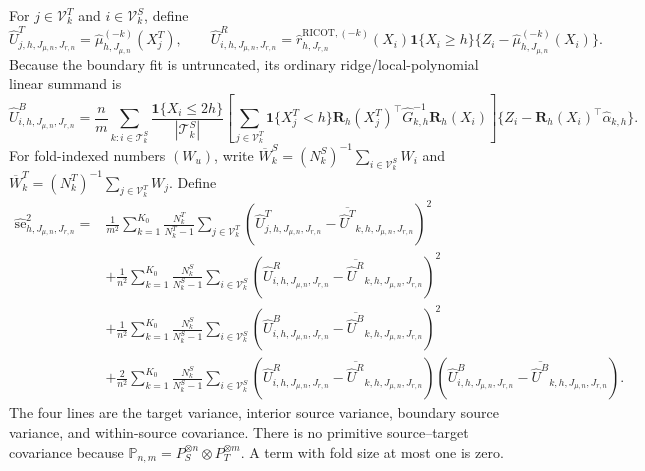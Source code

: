 For \(j\in\mathcal V^T_k\) and \(i\in\mathcal V^S_k\), define
\[
\widehat U^T_{j,h,J_{\mu,n},J_{r,n}}=\widehat\mu_{h,J_{\mu,n}}^{(-k)}(X_j^T),
\qquad
\widehat U^R_{i,h,J_{\mu,n},J_{r,n}}=\widehat r^{\mathrm{RICOT},(-k)}_{h,J_{r,n}}(X_i)\mathbf 1\{X_i\ge h\}\{Z_i-\widehat\mu_{h,J_{\mu,n}}^{(-k)}(X_i)\}.
\]
Because the boundary fit is untruncated, its ordinary ridge/local-polynomial linear summand is
\[
\widehat U^B_{i,h,J_{\mu,n},J_{r,n}}=\frac{n}{m}\sum_{k:i\in\mathcal T^S_k}\frac{\mathbf 1\{X_i\le2h\}}{|\mathcal T^S_k|}\left[\sum_{j\in\mathcal V^T_k}\mathbf 1\{X_j^T<h\}\mathbf R_h(X_j^T)^\top\widehat G_{k,h}^{-1}\mathbf R_h(X_i)\right]\{Z_i-\mathbf R_h(X_i)^\top\widehat\alpha_{k,h}\}.
\]
For fold-indexed numbers \((W_u)\), write \(\overline W_k^S=(N_k^S)^{-1}\sum_{i\in\mathcal V^S_k}W_i\) and \(\overline W_k^T=(N_k^T)^{-1}\sum_{j\in\mathcal V^T_k}W_j\). Define
\[
\begin{aligned}
\widehat{\mathrm{se}}_{h,J_{\mu,n},J_{r,n}}^2={}&\frac1{m^2}\sum_{k=1}^{K_0}\frac{N_k^T}{N_k^T-1}\sum_{j\in\mathcal V^T_k}(\widehat U^T_{j,h,J_{\mu,n},J_{r,n}}-\overline{\widehat U^T}_{k,h,J_{\mu,n},J_{r,n}})^2\\
&+\frac1{n^2}\sum_{k=1}^{K_0}\frac{N_k^S}{N_k^S-1}\sum_{i\in\mathcal V^S_k}(\widehat U^R_{i,h,J_{\mu,n},J_{r,n}}-\overline{\widehat U^R}_{k,h,J_{\mu,n},J_{r,n}})^2\\
&+\frac1{n^2}\sum_{k=1}^{K_0}\frac{N_k^S}{N_k^S-1}\sum_{i\in\mathcal V^S_k}(\widehat U^B_{i,h,J_{\mu,n},J_{r,n}}-\overline{\widehat U^B}_{k,h,J_{\mu,n},J_{r,n}})^2\\
&+\frac2{n^2}\sum_{k=1}^{K_0}\frac{N_k^S}{N_k^S-1}\sum_{i\in\mathcal V^S_k}(\widehat U^R_{i,h,J_{\mu,n},J_{r,n}}-\overline{\widehat U^R}_{k,h,J_{\mu,n},J_{r,n}})(\widehat U^B_{i,h,J_{\mu,n},J_{r,n}}-\overline{\widehat U^B}_{k,h,J_{\mu,n},J_{r,n}}).
\end{aligned}
\]
The four lines are the target variance, interior source variance, boundary source variance, and within-source covariance. There is no primitive source--target covariance because \(\mathbb P_{n,m}=P_S^{\otimes n}\otimes P_T^{\otimes m}\). A term with fold size at most one is zero.